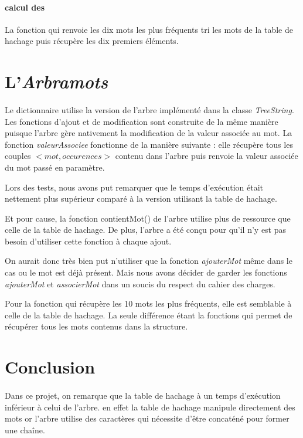 \documentclass[12pt,a4paper,final]{article}
\begin{document}
	\paragraph{calcul des}{La fonction qui renvoie les dix mots les plus fréquents tri les mots de la table de hachage puis récupère les dix premiers éléments.}
	
	
\newpage 

\section{L'\emph{Arbramots}}

	\paragraph{}{
Le dictionnaire utilise la version de l'arbre implémenté dans la classe \textit{TreeString}.
Les fonctions d'ajout et de modification sont construite de la même manière puisque l'arbre gère nativement la modification de la valeur associée au mot.
La fonction \textit{valeurAssociee} fonctionne de la manière suivante : elle récupère tous les couples $<mot,occurences>$ contenu dans l'arbre puis renvoie la valeur associée du mot passé en paramètre.

Lors des tests, nous avons put remarquer que le temps d’exécution était nettement plus supérieur comparé à la version utilisant la table de hachage. 

Et pour cause, la fonction contientMot() de l'arbre utilise plus de ressource que celle de la table de hachage. De plus, l'arbre a été conçu pour qu'il n'y est pas besoin d'utiliser cette fonction à chaque ajout. 

On aurait donc très bien put n'utiliser que la fonction \textit{ajouterMot} même dans le cas ou le mot est déjà présent. Mais nous avons décider de garder les fonctions \textit{ajouterMot} et \textit{associerMot} dans un soucis du respect du cahier des charges.

Pour la fonction qui récupère les 10 mots les plus fréquents, elle est semblable à celle de la table de hachage. La seule différence étant la fonctions qui permet de récupérer tous les mots contenus dans la structure.
}
\newpage
  
\section*{Conclusion}
\paragraph{}{
Dans ce projet, on remarque que la table de hachage à un temps d'exécution inférieur à celui de l'arbre. en effet la table de hachage manipule directement des mots or l'arbre utilise des caractères qui nécessite d'être concaténé pour former une chaîne. 
}
\end{document}
